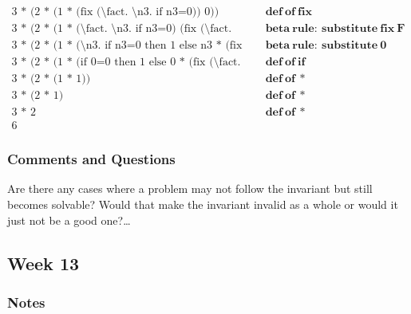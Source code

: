 \documentclass{article}
\theoremstyle{theorem}
\theoremstyle{definition}
\theoremstyle{remark}
\begin{document}
\begin{align*}
  \text{3 * (2 * (1 * (fix (\textbackslash fact. \textbackslash n3. if n3=0)) 0))} & \quad \mathbf{def\ of\ fix} \\
  \text{3 * (2 * (1 * (\textbackslash fact. \textbackslash n3. if n3=0) (fix (\textbackslash fact. \textbackslash n3. if n3=0)) 0))} & \quad \mathbf{beta\ rule:\ substitute\ fix\ F} \\
  \text{3 * (2 * (1 * (\textbackslash n3. if n3=0 then 1 else n3 * (fix (\textbackslash fact. \textbackslash n4. if n4=0)) (n3-1)) 0))} & \quad \mathbf{beta\ rule:\ substitute\ 0} \\
  \text{3 * (2 * (1 * (if 0=0 then 1 else 0 * (fix (\textbackslash fact. \textbackslash n4. if n4=0)) (0-1))))} & \quad \mathbf{def\ of\ if} \\
  \text{3 * (2 * (1 * 1))} & \quad \mathbf{def\ of\ *} \\
  \text{3 * (2 * 1)} & \quad \mathbf{def\ of\ *} \\
  \text{3 * 2} & \quad \mathbf{def\ of\ *} \\
  \text{6} &
\end{align*}


\subsubsection{Comments and Questions}

Are there any cases where a problem may not follow the invariant but still becomes solvable? Would that make the invariant invalid as a whole or would it just not be a good one?\ldots

\subsection{Week 13}
\subsubsection{Notes}
\end{document}
